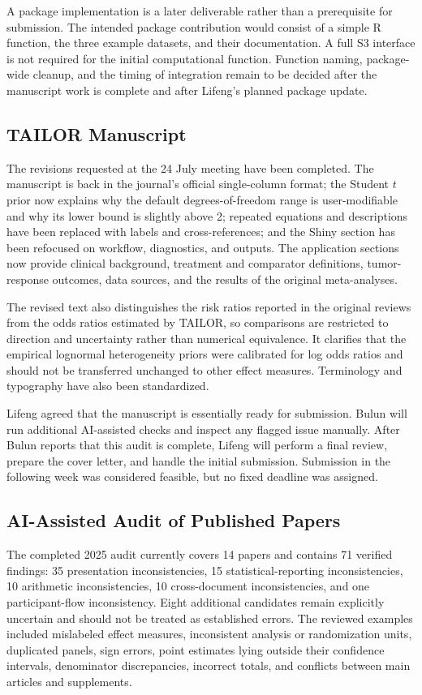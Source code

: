 \documentclass[11pt]{article}
\begin{document}
A package implementation is a later deliverable rather than a prerequisite for submission. The intended package contribution would consist of a simple R function, the three example datasets, and their documentation. A full S3 interface is not required for the initial computational function. Function naming, package-wide cleanup, and the timing of integration remain to be decided after the manuscript work is complete and after Lifeng's planned package update.

\subsection*{TAILOR Manuscript}

The revisions requested at the 24 July meeting have been completed. The manuscript is back in the journal's official single-column format; the Student $t$ prior now explains why the default degrees-of-freedom range is user-modifiable and why its lower bound is slightly above 2; repeated equations and descriptions have been replaced with labels and cross-references; and the Shiny section has been refocused on workflow, diagnostics, and outputs. The application sections now provide clinical background, treatment and comparator definitions, tumor-response outcomes, data sources, and the results of the original meta-analyses.

The revised text also distinguishes the risk ratios reported in the original reviews from the odds ratios estimated by TAILOR, so comparisons are restricted to direction and uncertainty rather than numerical equivalence. It clarifies that the empirical lognormal heterogeneity priors were calibrated for log odds ratios and should not be transferred unchanged to other effect measures. Terminology and typography have also been standardized.

Lifeng agreed that the manuscript is essentially ready for submission. Bulun will run additional AI-assisted checks and inspect any flagged issue manually. After Bulun reports that this audit is complete, Lifeng will perform a final review, prepare the cover letter, and handle the initial submission. Submission in the following week was considered feasible, but no fixed deadline was assigned.

\subsection*{AI-Assisted Audit of Published Papers}

The completed 2025 audit currently covers 14 papers and contains 71 verified findings: 35 presentation inconsistencies, 15 statistical-reporting inconsistencies, 10 arithmetic inconsistencies, 10 cross-document inconsistencies, and one participant-flow inconsistency. Eight additional candidates remain explicitly uncertain and should not be treated as established errors. The reviewed examples included mislabeled effect measures, inconsistent analysis or randomization units, duplicated panels, sign errors, point estimates lying outside their confidence intervals, denominator discrepancies, incorrect totals, and conflicts between main articles and supplements.
\end{document}
